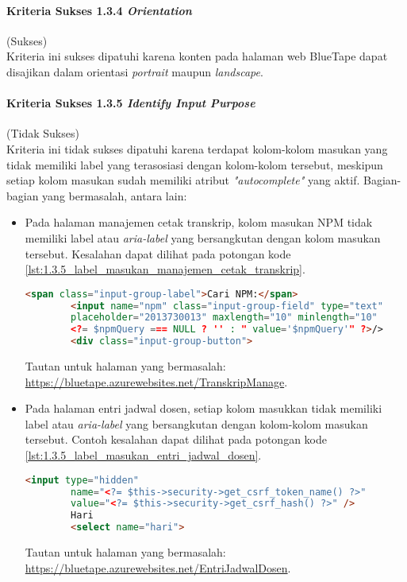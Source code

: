\paragraph{Kriteria Sukses 1.3.4 \textit{Orientation}}
\label{par:kepatuhan_bluetape_kriteria_sukses_1.3.4}
(Sukses)\\

Kriteria ini sukses dipatuhi karena konten pada halaman web BlueTape dapat disajikan dalam orientasi \textit{portrait} maupun \textit{landscape}.

\paragraph{Kriteria Sukses 1.3.5 \textit{Identify Input Purpose}}
\label{par:kepatuhan_bluetape_kriteria_sukses_1.3.5}
(Tidak Sukses)\\

Kriteria ini tidak sukses dipatuhi karena terdapat kolom-kolom masukan yang tidak memiliki label yang terasosiasi dengan kolom-kolom tersebut, meskipun setiap kolom masukan sudah memiliki atribut \textit{"autocomplete"} yang aktif. Bagian-bagian yang bermasalah, antara lain:
\begin{itemize}
    \item Pada halaman manajemen cetak transkrip, kolom masukan NPM tidak memiliki label atau \textit{aria-label} yang bersangkutan dengan kolom masukan tersebut. Kesalahan dapat dilihat pada potongan kode \ref{lst:1.3.5_label_masukan_manajemen_cetak_transkrip}.
    \begin{lstlisting}[frame=single, label={lst:1.3.5_label_masukan_manajemen_cetak_transkrip}, language=HTML, caption=Kriteria Sukses 1.3.5 - Tidak Terdapat Label pada Kolom Masukan di Halaman Manajemen Cetak Transkrip]
        <span class="input-group-label">Cari NPM:</span>
        <input name="npm" class="input-group-field" type="text"
        placeholder="2013730013" maxlength="10" minlength="10"
        <?= $npmQuery === NULL ? '' : " value='$npmQuery'" ?>/>
        <div class="input-group-button">
    \end{lstlisting}
    Tautan untuk halaman yang bermasalah: \url{https://bluetape.azurewebsites.net/TranskripManage}.

    \item Pada halaman entri jadwal dosen, setiap kolom masukkan tidak memiliki label atau \textit{aria-label} yang bersangkutan dengan kolom-kolom masukan tersebut. Contoh kesalahan dapat dilihat pada potongan kode \ref{lst:1.3.5_label_masukan_entri_jadwal_dosen}.
    \begin{lstlisting}[frame=single, label={lst:1.3.5_label_masukan_entri_jadwal_dosen}, language=HTML, caption=Kriteria Sukses 1.3.5 - Tidak Terdapat Label pada Kolom Masukan di Halaman Entri Jadwal Dosen]
        <input type="hidden" 
        name="<?= $this->security->get_csrf_token_name() ?>"
        value="<?= $this->security->get_csrf_hash() ?>" />
        Hari
        <select name="hari">
    \end{lstlisting}
    Tautan untuk halaman yang bermasalah: \url{https://bluetape.azurewebsites.net/EntriJadwalDosen}.
\end{itemize}

